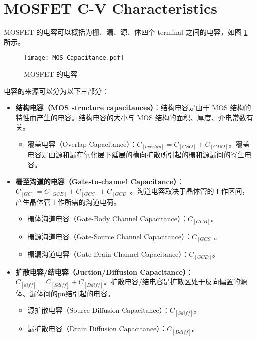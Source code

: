 \section{MOSFET C-V Characteristics}

MOSFET 的电容可以概括为栅、漏、源、体四个 terminal 之间的电容，如图 \ref{fig:mosfet_capacitance} 所示。

\begin{figure}[!htb]
    \centering
    \texttt{[image: MOS\_Capacitance.pdf]}
    \caption{MOSFET 的电容\cite{CMOS-VLSI}}
    \label{fig:mosfet_capacitance}
\end{figure}

电容的来源可以分为以下三部分：
\begin{itemize}
    \item \textbf{结构电容（MOS structure capacitances）}：结构电容是由于 MOS 结构的特性而产生的电容。结构电容的大小与 MOS 结构的面积、厚度、介电常数有关。
    \begin{itemize}
        \item 覆盖电容（Overlap Capacitance）：$C_[overlap] = C_[GSO] + C_[GDO]$。覆盖电容是由源和漏在氧化层下延展的横向扩散所引起的栅和源漏间的寄生电容。
    \end{itemize}
    \item \textbf{栅至沟道的电容（Gate-to-channel Capacitance）}：$C_[GC] = C_[GCB] + C_[GCS] + C_[GCD]$。沟道电容取决于晶体管的工作区间，产生晶体管工作所需的沟道电荷。
    \begin{itemize}
        \item 栅体沟道电容（Gate-Body Channel Capacitance）：$C_[GCB]$。
        \item 栅源沟道电容（Gate-Source Channel Capacitance）：$C_[GCS]$。
        \item 栅漏沟道电容（Gate-Drain Channel Capacitance）：$C_[GCD]$。
    \end{itemize}
    \item \textbf{扩散电容/结电容（Juction/Diffusion Capacitance）}：$C_[diff] = C_[Sdiff] + C_[Ddiff]$。扩散电容/结电容是扩散区处于反向偏置的源体、漏体间的pn结引起的电容。
    \begin{itemize}
        \item 源扩散电容（Source Diffusion Capacitance）：$C_[Sdiff]$。
        \item 漏扩散电容（Drain Diffusion Capacitance）：$C_[Ddiff]$。
    \end{itemize}
\end{itemize}

